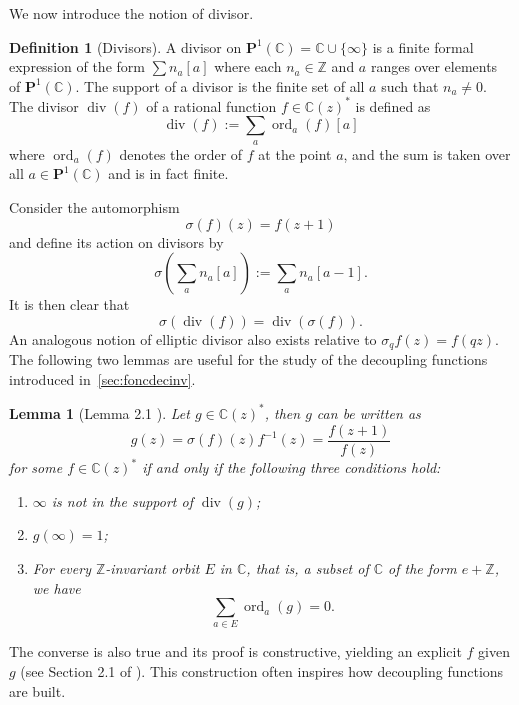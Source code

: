 \documentclass[11pt]{article}
\newtheorem{lem}[thm]{Lemma}
\theoremstyle{definition}
\newtheorem{deffr}[thm]{Definition}
\begin{document}
We now introduce the notion of divisor.
\begin{deffr}[Divisors]
A divisor on $\mathbf{P}^1(\mathbb{C}) = \mathbb{C} \cup \{\infty\}$ is a finite formal expression of the form $\sum n_a[a]$ where each $n_a \in \mathbb{Z}$ and $a$ ranges over elements of $\mathbf{P}^1(\mathbb{C})$. The support of a divisor is the finite set of all $a$ such that $n_a \neq 0$. The divisor $\operatorname{div}(f)$ of a rational function $f \in \mathbb{C}(z)^*$ is defined as
\[
\operatorname{div}(f) := \sum_a \operatorname{ord}_a(f)[a]
\]
where $\operatorname{ord}_a(f)$ denotes the order of $f$ at the point $a$, and the sum is taken over all $a \in \mathbf{P}^1(\mathbb{C})$ and is in fact finite.
\end{deffr}

Consider the automorphism $$\sigma (f) (z)=f(z+1)$$ and define its action on divisors by
\[
\sigma\left(\sum_a n_a\left[a\right]\right) := \sum_a n_a\left[a -1\right].
\]
It is then clear that 
\begin{equation}
\label{eq:sdiv}
\sigma(\operatorname{div}(f)) = \operatorname{div}(\sigma(f)).
\end{equation}
An analogous notion of elliptic divisor also exists relative to $\sigma_q f(z) = f(qz)$. The following two lemmas are useful for the study of the decoupling functions introduced in~\ref{sec:foncdecinv}.

\begin{lem}[Lemma 2.1 \cite{vdps}]
Let $g \in \mathbb{C}(z)^*$, then $g$ can be written as 
$$g(z)=\sigma(f)(z) f^{-1} (z)=\frac{f(z+1)}{f(z)}$$ 
for some $f \in \mathbb{C}(z)^*$ if and only if the following three conditions hold:
\begin{enumerate}
    \item $\infty$ is not in the support of $\operatorname{div}(g)$;
    \item $g(\infty) = 1$;
    \item For every $\mathbb{Z}$-invariant orbit $E$ in $\mathbb{C}$, that is, a subset of $\mathbb{C}$ of the form $e + \mathbb{Z}$, we have
    \[
    \sum_{a \in E} \operatorname{ord}_a(g) = 0.
    \]
\end{enumerate}
\end{lem}
The converse is also true and its proof is constructive, yielding an explicit $f$ given $g$ (see Section 2.1 of \cite{vdps}). This construction often inspires how decoupling functions are built.
\end{document}
